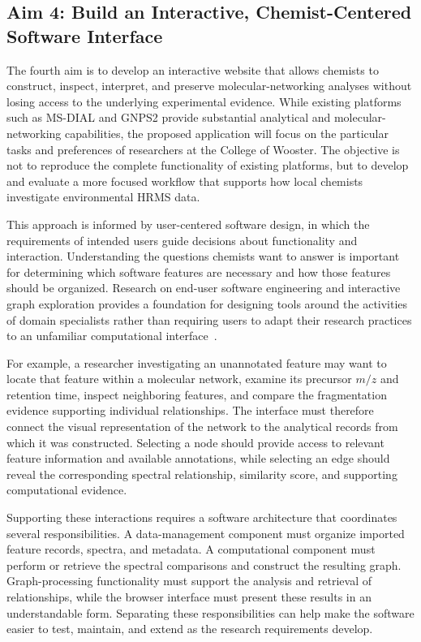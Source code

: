     \subsection{Aim 4: Build an Interactive, Chemist-Centered Software Interface}\label{subsec:aim-four}

        The fourth aim is to develop an interactive website that allows chemists to construct, inspect, interpret, and preserve molecular-networking analyses without losing access to the underlying experimental evidence. While existing platforms such as MS-DIAL and GNPS2 provide substantial analytical and molecular-networking capabilities, the proposed application will focus on the particular tasks and preferences of researchers at the College of Wooster. The objective is not to reproduce the complete functionality of existing platforms, but to develop and evaluate a more focused workflow that supports how local chemists investigate environmental HRMS data.

        This approach is informed by user-centered software design, in which the requirements of intended users guide decisions about functionality and interaction. Understanding the questions chemists want to answer is important for determining which software features are necessary and how those features should be organized. Research on end-user software engineering and interactive graph exploration provides a foundation for designing tools around the activities of domain specialists rather than requiring users to adapt their research practices to an unfamiliar computational interface~\cite{Ko2011,Pienta2015}.

        For example, a researcher investigating an unannotated feature may want to locate that feature within a molecular network, examine its precursor $m/z$ and retention time, inspect neighboring features, and compare the fragmentation evidence supporting individual relationships. The interface must therefore connect the visual representation of the network to the analytical records from which it was constructed. Selecting a node should provide access to relevant feature information and available annotations, while selecting an edge should reveal the corresponding spectral relationship, similarity score, and supporting computational evidence.

        Supporting these interactions requires a software architecture that coordinates several responsibilities. A data-management component must organize imported feature records, spectra, and metadata. A computational component must perform or retrieve the spectral comparisons and construct the resulting graph. Graph-processing functionality must support the analysis and retrieval of relationships, while the browser interface must present these results in an understandable form. Separating these responsibilities can help make the software easier to test, maintain, and extend as the research requirements develop.

